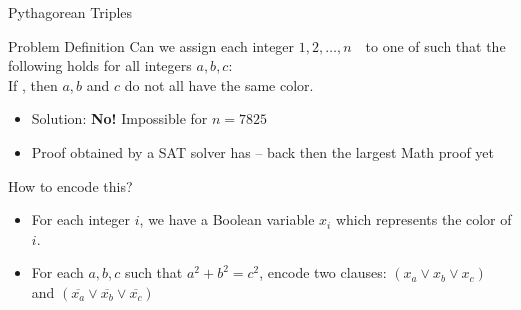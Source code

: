 \documentclass[t]{sdqbeamer}
\begin{document}
\begin{frame}{Pythagorean Triples}
\begin{block}{Problem Definition}
Can we assign each integer $1,2,\ldots,n$\ \ to one of  such that the following holds for all integers $a,b,c$:
\\
If , then $a,b$ and $c$ do not all have the same color.
\end{block}
\begin{itemize}
	\item Solution: \textbf{No!} Impossible for $n=7825$
	\item Proof obtained by a SAT solver has  -- back then the largest Math proof yet
\end{itemize}
\pause
\vspace*{6mm}
\begin{block}{How to encode this?}
\pause
\begin{itemize}
	\item For each integer $i$, we have a Boolean variable $x_i$ which represents the color of $i$.
	\item For each $a,b,c$ such that $a^2+b^2=c^2$, encode two clauses: $(x_a \vee x_b \vee x_c)$
	and $(\overline{x_a} \vee \overline{x_b} \vee \overline{x_c})$
\end{itemize}
\end{block}
\end{frame}
\end{document}
